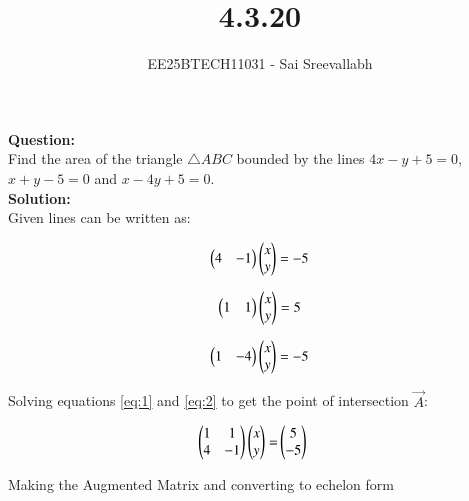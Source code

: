 \documentclass[journal]{IEEEtran}
\begin{document}

\vspace{3cm}

\title{4.3.20}
\author {EE25BTECH11031 - Sai Sreevallabh}
{\let\newpage\relax\maketitle}

\renewcommand{\thefigure}{\theenumi}
\renewcommand{\thetable}{\theenumi}
\setlength{\intextsep}{10pt} %


\renewcommand{\thetable}{\theenumi}

\textbf{Question: }\\

Find the area of the triangle $\triangle ABC$ bounded by the lines $4x-y+5 = 0$, $x+y-5 = 0$ and $x-4y+5 = 0$. \\

\textbf{Solution: }\\

Given lines can be written as: 

\begin{align}
    \begin{pmatrix}4&-1\end{pmatrix}\begin{pmatrix}x\\y\end{pmatrix} = -5 \label{eq:1}
\end{align}

\begin{align}
    \begin{pmatrix}1&1\end{pmatrix}\begin{pmatrix}x\\y\end{pmatrix} = 5 \label{eq:2}
\end{align}

\begin{align}
    \begin{pmatrix}1&-4\end{pmatrix}\begin{pmatrix}x\\y\end{pmatrix} = -5 \label{eq:3}
\end{align}

Solving equations \eqref{eq:1} and \eqref{eq:2} to get the point of intersection $\vec{A}$:

\begin{align}
    \begin{pmatrix}1&1\\4&-1\end{pmatrix}\begin{pmatrix}x\\y\end{pmatrix} =& \begin{pmatrix}5\\-5\end{pmatrix}
\end{align}

Making the Augmented Matrix and converting to echelon form
\end{document}
